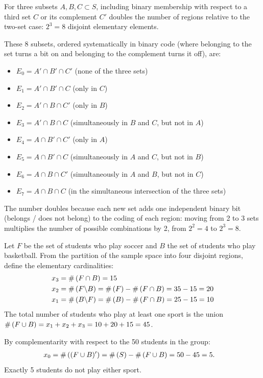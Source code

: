 \begin{solproblema}[prob:320d62d]
	For three subsets $A, B, C \subset S$, including binary membership with respect to a third set $C$ or its complement $C'$ doubles the number of regions relative to the two-set case: $2^3 = 8$ disjoint elementary elements.

	These 8 subsets, ordered systematically in binary code (where belonging to the set turns a bit on and belonging to the complement turns it off), are:
	\begin{itemize}
		\item $E_0 = A' \cap B' \cap C'$ (none of the three sets)
		\item $E_1 = A' \cap B' \cap C$ (only in $C$)
		\item $E_2 = A' \cap B \cap C'$ (only in $B$)
		\item $E_3 = A' \cap B \cap C$ (simultaneously in $B$ and $C$, but not in $A$)
		\item $E_4 = A \cap B' \cap C'$ (only in $A$)
		\item $E_5 = A \cap B' \cap C$ (simultaneously in $A$ and $C$, but not in $B$)
		\item $E_6 = A \cap B \cap C'$ (simultaneously in $A$ and $B$, but not in $C$)
		\item $E_7 = A \cap B \cap C$ (in the simultaneous intersection of the three sets)
	\end{itemize}
	The number doubles because each new set adds one independent binary bit (belongs / does not belong) to the coding of each region: moving from 2 to 3 sets multiplies the number of possible combinations by 2, from $2^2=4$ to $2^3=8$.
\end{solproblema}

\begin{solproblema}
	Let $F$ be the set of students who play soccer and $B$ the set of students who play basketball. From the partition of the sample space into four disjoint regions, define the elementary cardinalities:
	\begin{align}
		x_3 &= \#\left( F \cap B \right) = 15 \\
		x_2 &= \#\left( F \backslash B \right) = \#\left( F \right) - \#\left( F \cap B \right) = 35 - 15 = 20 \\
		x_1 &= \#\left( B \backslash F \right) = \#\left( B \right) - \#\left( F \cap B \right) = 25 - 15 = 10
	\end{align}
	The total number of students who play at least one sport is the union $\#\left( F \cup B \right) = x_1 + x_2 + x_3 = 10 + 20 + 15 = 45$.

	By complementarity with respect to the 50 students in the group:
	\begin{align}
		x_0 &= \#\left( (F \cup B)' \right) = \#\left( S \right) - \#\left( F \cup B \right) = 50 - 45 = 5.
	\end{align}
	Exactly 5 students do not play either sport.
\end{solproblema}

